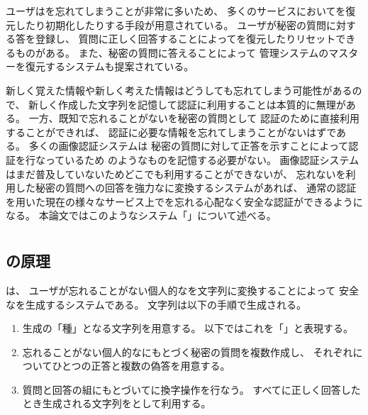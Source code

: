 \documentclass[twoside]{wiss}
\begin{document}
ユーザは{\PW}を忘れてしまうことが非常に多いため、
多くのサービスにおいて{\PW}を復元したり初期化したりする手段が用意されている。
ユーザが秘密の質問に対する答を登録し、
質問に正しく回答することによって{\PW}を復元したりリセットできるものがある。
また、秘密の質問に答えることによって
{\PW}管理システムのマスター{\PW}を復元するシステム\cite{平野亮:2011-11-07}も提案されている。

新しく覚えた情報や新しく考えた情報はどうしても忘れてしまう可能性があるので、
新しく作成した{\PW}文字列を記憶して認証に利用することは本質的に無理がある。
一方、既知で忘れることがない{\EM}を秘密の質問として
認証のために直接利用することができれば、
認証に必要な情報を忘れてしまうことがないはずである。
多くの画像認証システム\cite{小池英樹:2006-05-15}は
秘密の質問に対して正答を示すことによって認証を行なっているため
{\PW}のようなものを記憶する必要がない。
%
画像認証システムはまだ普及していないためどこでも利用することができないが、
忘れない{\EM}を利用した秘密の質問への回答を強力な{\PW}に変換するシステムがあれば、
通常の{\PW}認証を用いた現在の様々なサービス上で{\PW}を忘れる心配なく安全な認証ができるようになる。
本論文ではこのようなシステム「{\EP}」について述べる。

\section{{\EP}}

\subsection{{\EP}の原理}

{\EP}は、
ユーザが忘れることがない個人的な{\EM}を文字列に変換することによって
安全な{\PW}を生成するシステムである。
{\PW}文字列は以下の手順で生成される。

\begin{enumerate}
\item {\PW}生成の「種」となる文字列を用意する。
以下ではこれを「{\SS}」と表現する。
\item 忘れることがない個人的な{\EM}にもとづく秘密の質問を複数作成し、
それぞれについてひとつの正答と複数の偽答を用意する。
\item 質問と回答の組にもとづいて{\SS}に換字操作を行なう。
すべてに正しく回答したとき生成される文字列を{\PW}として利用する。
\end{enumerate}
\end{document}
